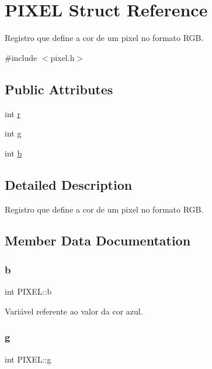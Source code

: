\hypertarget{structPIXEL}{}\section{P\+I\+X\+EL Struct Reference}
\label{structPIXEL}


Registro que define a cor de um pixel no formato R\+GB.  




{\ttfamily \#include $<$pixel.\+h$>$}

\subsection*{Public Attributes}
\begin{DoxyCompactItemize}
\item 
int \hyperlink{structPIXEL_ab6ca89f5882386162fc799c387d4be19}{r}
\item 
int \hyperlink{structPIXEL_a08270c3071d7743cf945ca4364f67c3b}{g}
\item 
int \hyperlink{structPIXEL_adf2d9f9f07e3f7db2613ac75c68f4584}{b}
\end{DoxyCompactItemize}


\subsection{Detailed Description}
Registro que define a cor de um pixel no formato R\+GB. 

\subsection{Member Data Documentation}
\mbox{\label{structPIXEL_adf2d9f9f07e3f7db2613ac75c68f4584}} 
\subsubsection{\texorpdfstring{b}{b}}
{\footnotesize\ttfamily int P\+I\+X\+E\+L\+::b}

Variável referente ao valor da cor azul. \mbox{\label{structPIXEL_a08270c3071d7743cf945ca4364f67c3b}} 
\subsubsection{\texorpdfstring{g}{g}}
{\footnotesize\ttfamily int P\+I\+X\+E\+L\+::g}

